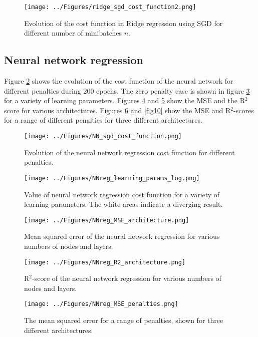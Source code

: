 \documentclass[notitlepage, reprint, nofootinbib]{revtex4-1}
\begin{document}
\begin{figure}
	\centering 
	\texttt{[image: ../Figures/ridge\_sgd\_cost\_function2.png]}
	\caption{Evolution of the cost function in Ridge regression using SGD for different number of minibatches $n$. }
	\label{fig4}
\end{figure}

\subsection{Neural network regression}
Figure \ref{fig5} shows the evolution of the cost function of the neural network for different penalties during 200 epochs. The zero penalty case is shown in figure \ref{fig6} for a variety of learning parameters. Figures \ref{fig7} and \ref{fig8} show the MSE and the R$^2$ score for various architectures. Figures \ref{fig9} and \ref{fig10} show the MSE and R$^2$-scores for a range of different penalties for three different architectures. 

\begin{figure}
	\centering 
	\texttt{[image: ../Figures/NN\_sgd\_cost\_function.png]}
	\caption{Evolution of the neural network regression cost function for different penalties.}
	\label{fig5}
\end{figure}

\begin{figure}
	\centering 
	\texttt{[image: ../Figures/NNreg\_learning\_params\_log.png]}
	\caption{Value of neural network regression cost function for a variety of learning parameters. The white areas indicate a diverging result. }
	\label{fig6}
\end{figure}

\begin{figure}
	\centering 
	\texttt{[image: ../Figures/NNreg\_MSE\_architecture.png]}
	\caption{Mean squared error of the neural network regression for various numbers of nodes and layers. }
	\label{fig7}
\end{figure}

\begin{figure}
	\centering 
	\texttt{[image: ../Figures/NNreg\_R2\_architecture.png]}
	\caption{R$^2$-score of the neural network regression for various numbers of nodes and layers. }
	\label{fig8}
\end{figure}

\begin{figure}
	\centering 
	\texttt{[image: ../Figures/NNreg\_MSE\_penalties.png]}
	\caption{The mean squared error for a range of penalties, shown for three different architectures.}
	\label{fig9}
\end{figure}
\end{document}
